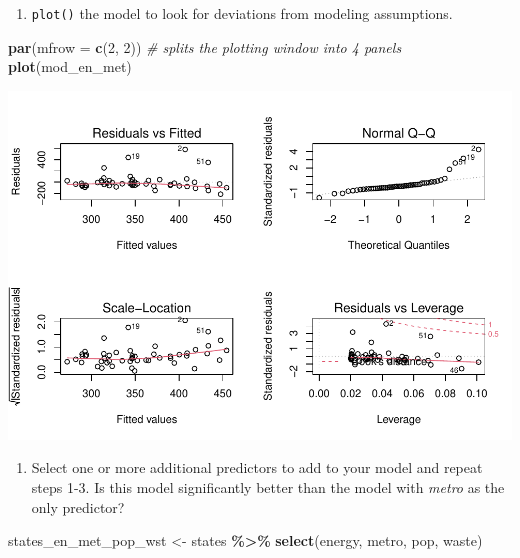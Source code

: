 \documentclass[
]{book}
\newenvironment{Shaded}{\begin{snugshade}}{\end{snugshade}}
\newcommand{\CommentTok}[1]{\textcolor[rgb]{0.56,0.35,0.01}{\textit{#1}}}
\newcommand{\DataTypeTok}[1]{\textcolor[rgb]{0.13,0.29,0.53}{#1}}
\newcommand{\DecValTok}[1]{\textcolor[rgb]{0.00,0.00,0.81}{#1}}
\newcommand{\KeywordTok}[1]{\textcolor[rgb]{0.13,0.29,0.53}{\textbf{#1}}}
\newcommand{\NormalTok}[1]{#1}
\newcommand{\OperatorTok}[1]{\textcolor[rgb]{0.81,0.36,0.00}{\textbf{#1}}}
\newcommand{\StringTok}[1]{\textcolor[rgb]{0.31,0.60,0.02}{#1}}
\providecommand{\tightlist}{%
  \setlength{\itemsep}{0pt}\setlength{\parskip}{0pt}}
\begin{document}
\begin{alert}
\begin{enumerate}
\def\labelenumi{\arabic{enumi}.}
\setcounter{enumi}{2}
\tightlist
\item
  \texttt{plot()} the model to look for deviations from modeling assumptions.
\end{enumerate}

\begin{Shaded}
\begin{Highlighting}[]
  \KeywordTok{par}\NormalTok{(}\DataTypeTok{mfrow =} \KeywordTok{c}\NormalTok{(}\DecValTok{2}\NormalTok{, }\DecValTok{2}\NormalTok{)) }\CommentTok{\# splits the plotting window into 4 panels}
  \KeywordTok{plot}\NormalTok{(mod\_en\_met)}
\end{Highlighting}
\end{Shaded}

\includegraphics{R/Rmodels/figures/unnamed-chunk-102-1.pdf}

\begin{enumerate}
\def\labelenumi{\arabic{enumi}.}
\setcounter{enumi}{3}
\tightlist
\item
  Select one or more additional predictors to add to your model and repeat steps 1-3. Is this model significantly better than the model with \emph{metro} as the only predictor?
\end{enumerate}

\begin{Shaded}
\begin{Highlighting}[]
\NormalTok{  states\_en\_met\_pop\_wst \textless{}{-}}\StringTok{ }
\StringTok{      }\NormalTok{states }\OperatorTok{\%\textgreater{}\%}
\StringTok{      }\KeywordTok{select}\NormalTok{(energy, metro, pop, waste)}


\end{Highlighting}
\end{Shaded}
\end{alert}
\end{document}
